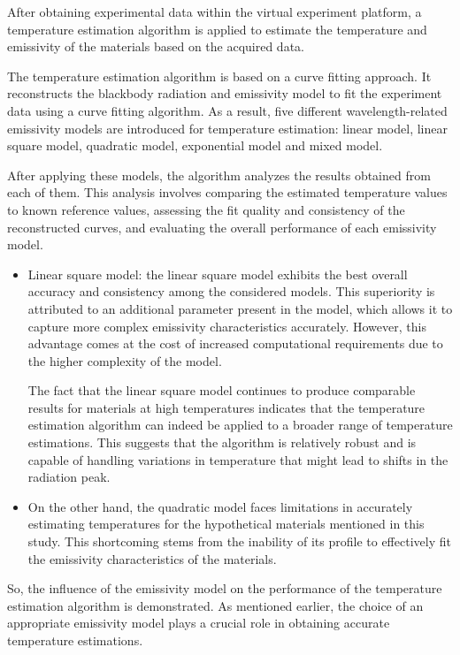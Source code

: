 After obtaining experimental data within the virtual experiment platform, a temperature estimation 
algorithm is applied to estimate the temperature and emissivity of the materials based on the 
acquired data.


The temperature estimation algorithm is based on a curve fitting approach. It reconstructs 
the blackbody radiation and emissivity model to fit the experiment data using a curve fitting 
algorithm. As a result, five different wavelength-related emissivity models are introduced for temperature 
estimation: linear model, linear square model, quadratic model, exponential model and mixed model. 


After applying these models, the algorithm analyzes the results obtained from each of them. 
This analysis involves comparing the estimated temperature values to known reference values, 
assessing the fit quality and consistency of the reconstructed curves, and evaluating the overall performance 
of each emissivity model.

\begin{itemize}

\item Linear square model: the linear square model exhibits the best overall accuracy and consistency among the considered 
models. This superiority is attributed to an additional parameter present in the model, 
which allows it to capture more complex emissivity characteristics accurately. However, 
this advantage comes at the cost of increased computational requirements due to the higher 
complexity of the model.


The fact that the linear square model continues to produce comparable results for 
materials at high temperatures indicates that the temperature estimation algorithm can 
indeed be applied to a broader range of temperature estimations. This suggests that the 
algorithm is relatively robust and is capable of handling variations in temperature that 
might lead to shifts in the radiation peak.


\item On the other hand, the quadratic model faces limitations in accurately estimating 
temperatures for the hypothetical materials mentioned in this study. This shortcoming stems 
from the inability of its profile to effectively fit the emissivity characteristics of the materials.

\end{itemize}

So, the influence of the emissivity model on the performance of the temperature 
estimation algorithm is demonstrated. As mentioned earlier, the choice of an appropriate 
emissivity model plays a crucial role in obtaining accurate temperature estimations.

